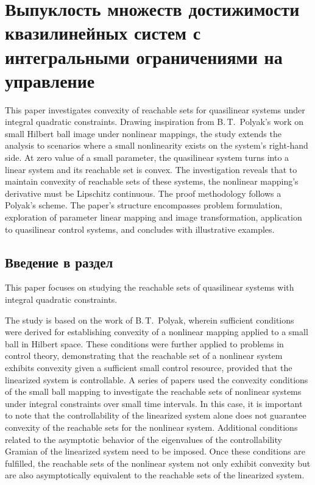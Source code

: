 \documentclass[../main.tex]{subfiles}
\begin{document}
\newpage
\section{Выпуклость множеств достижимости квазилинейных систем с интегральными ограничениями на управление}
This paper investigates convexity of reachable sets for quasilinear systems under integral quadratic constraints. Drawing inspiration from B.\,T.~Polyak's work on small Hilbert ball image under nonlinear mappings, the study extends the analysis to scenarios where a small nonlinearity exists on the system's right-hand side. At zero value of a small parameter, the quasilinear system turns into a linear system and its reachable set is convex.  The investigation reveals that to maintain convexity of reachable sets of these systems, the nonlinear mapping's derivative must be Lipschitz continuous. The proof methodology follows a Polyak's scheme. The paper's structure encompasses problem formulation, exploration of parameter linear mapping and image transformation, application to quasilinear control systems, and concludes with illustrative examples. 

\subsection{Введение в раздел}

This paper focuses on studying the reachable sets of quasilinear systems with integral quadratic constraints.

The study is based on the work of B.\,T.~Polyak\cite{Polyak2001, Polyak2004}, wherein sufficient conditions were derived for establishing convexity of a nonlinear mapping applied to a small ball in Hilbert space. These conditions were further applied to problems in control theory, demonstrating that the reachable set of a nonlinear system exhibits convexity given a sufficient small control resource, provided that the linearized system is controllable. A series of papers \cite{GusOsSteklov, GusevUMJ, Osipov, GusOsUdmurt} used the convexity conditions of the small ball mapping to investigate the reachable sets of nonlinear systems under integral constraints over small time intervals. 
In this case, it is important to note that the controllability of the linearized system alone does not guarantee convexity of the reachable sets for the nonlinear system. Additional conditions related to the asymptotic behavior of the eigenvalues of the controllability Gramian of the linearized system need to be imposed.  Once these conditions are fulfilled, the reachable sets of the nonlinear system not only exhibit convexity but are also asymptotically equivalent to the reachable sets of the linearized system.
\end{document}
